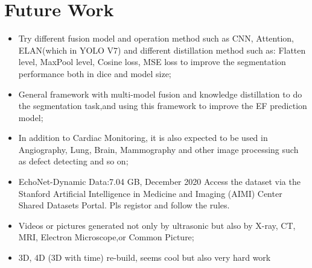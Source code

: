 \vfill
\section{Future Work}

\begin{itemize}
  \item Try different fusion model and operation method such as CNN, Attention, ELAN(which in YOLO V7) and different distillation method such as: Flatten level, MaxPool level, Cosine loss, MSE loss to improve the segmentation performance both in dice and model size;
  \item General framework with multi-model fusion and knowledge distillation to do the segmentation task,and using this framework to improve the EF prediction model;
  \item In addition to Cardiac Monitoring, it is also expected to be used in Angiography,  Lung, Brain, Mammography  and other image processing such as defect detecting and so on;
  \item EchoNet-Dynamic	 Data:7.04 GB, December 2020
Access the dataset via the Stanford Artificial Intelligence in Medicine and Imaging (AIMI) Center Shared Datasets Portal. Pls registor and follow the rules.
  \item Videos or pictures generated not only by ultrasonic but also by X-ray,  CT, MRI, Electron Microscope,or Common Picture;
  \item 3D, 4D (3D with time) re-build, seems cool but also very hard work
\end{itemize}
